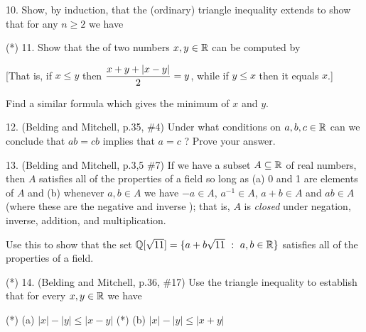 \documentclass[12pt]{article}
\begin{document}
\begin{description}

\item{10.} Show, by induction, that the (ordinary) triangle
inequality extends to show that for any $n\geq 2$ we have

\ssk


\msk

\item{(*) 11.} Show that the  of two numbers $x,y\in{\mathbb R}$ 
can be computed by 

\ssk


\ssk

[That is, if $x\leq y$ then $\displaystyle {{x+y+|x-y|}\over{2}} = y$, while if $y\leq x$ then it equals $x$.]

\ssk

Find a similar formula which gives the minimum of $x$ and $y$.


\msk

\item{12.} (Belding and Mitchell, p.35, \#4) Under what conditions on $a,b,c\in{\mathbb R}$ can we
conclude that $ab=cb$ implies that $a=c$ ? Prove your answer.

\msk

\item{13.} (Belding and Mitchell, p.3,5 \#7) If we have a subset $A\subseteq{\mathbb R}$ of real numbers, 
then $A$ satisfies all of the properties of a field so long as (a) 0 and 1 are elements of $A$ and
(b) whenever $a,b\in A$ we have $-a\in A$,  $a^{-1}\in A$, $a+b\in A$ and $ab\in A$ (where these 
are the negative and inverse    ); that is,
$A$ is {\it closed} under negation, inverse, addition, and multiplication.

\ssk

Use this to show that the set $\bbq[\sqrt{11}]=\{a+b\sqrt{11}\ :\ a,b\in\bbr\}$ satisfies all of the 
properties of a field.

\msk

\item{(*) 14.} (Belding and Mitchell, p.36, \#17) Use the triangle inequality to establish
that for every $x,y\in{\mathbb R}$ we have

\ssk

\item{(*)} (a) $|x|-|y|\leq |x-y|$
\hskip2in (*) (b) $|x|-|y|\leq |x+y|$


\end{description}
\end{document}
